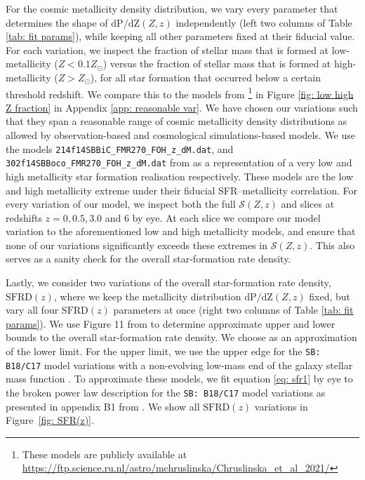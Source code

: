 \documentclass[twocolumn]{aastex631}
\newcommand{\SFRDzZ}{\ensuremath{\mathcal{S}(Z,z)}\xspace}
\newcommand{\SFRDz}{\ensuremath{\mathrm{SFRD}(z)}\xspace}
\newcommand{\dpdZ}{\ensuremath{\mathrm{dP/dZ}(Z,z)}\xspace}
\begin{document}
For the cosmic metallicity density distribution, we vary every parameter that determines the shape of \dpdZ independently (left two columns of Table \ref{tab: fit params}), while keeping all other parameters fixed at their fiducial value.
For each variation, we inspect the fraction of stellar mass that is formed at low-metallicity ($Z<0.1 Z_{\odot}$) versus the fraction of stellar mass that is formed at high-metallicity ($Z> Z_{\odot}$), for all star formation that occurred below a certain threshold redshift.
We compare this to the models from \cite{Chruslinska+2021}\footnote{These models are publicly available at \url{https://ftp.science.ru.nl/astro/mchruslinska/Chruslinska_et_al_2021/}} in Figure \ref{fig: low high Z fraction} in Appendix \ref{app: reasonable var}.
We have chosen our variations such that they span a reasonable range of cosmic metallicity density distributions as allowed by observation-based and cosmological simulations-based models.
We use the models \texttt{214f14SBBiC\_FMR270\_FOH\_z\_dM.dat}, and \texttt{302f14SBBoco\_FMR270\_FOH\_z\_dM.dat} from \cite{Chruslinska+2021} as a representation of a very low and high metallicity star formation realisation respectively. These models are the low and high metallicity extreme under their fiducial SFR–metallicity correlation.
For every variation of our model, we inspect both the full \SFRDzZ and slices at redshifts $z = 0, 0.5, 3.0$ and $6$ by eye. At each slice we compare our model variation to the aforementioned low and high metallicity models, and ensure that none of our variations significantly exceeds these extremes in \SFRDzZ. This also serves as a sanity check for the overall star-formation rate density.


Lastly, we consider two variations of the overall star-formation rate density, \SFRDz, where we keep the metallicity distribution \dpdZ fixed, but vary all four \SFRDz parameters at once (right two columns of Table \ref{tab: fit params}). 
We use Figure 11 from \cite{Chruslinska+2021} to determine approximate upper and lower bounds to the overall star-formation rate density. We choose \cite{Madau+2017} as an approximation of the lower limit. For the upper limit, we use the upper edge for the \texttt{SB: B18/C17} model variations with a non-evolving low-mass end of the galaxy stellar mass function \citep[table B1 from][also shown as thick brown line in their Fig. 11]{Chruslinska+2021}. To approximate these models, we fit equation \ref{eq: sfr1} by eye to the broken power law description for the  \texttt{SB: B18/C17} model variations as presented in appendix B1 from \cite{Chruslinska+2021}.
We show all \SFRDz variations in Figure~\ref{fig: SFR(z)}. \\
\end{document}
